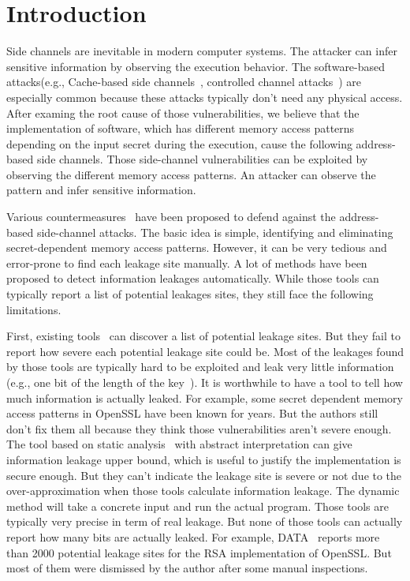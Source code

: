 \section{Introduction}

Side channels are inevitable in modern computer systems. The attacker can infer sensitive 
information by observing the execution behavior. The software-based attacks(e.g., Cache-based 
side channels~\cite{184415,191010,7163050,Osvik:2006:CAC:2117739.2117741}, 
controlled channel attacks~\cite{7163052}) 
are especially common because these attacks typically don't need any physical access. 
After examing the root cause of those vulnerabilities, we believe that the implementation 
of software, which has different memory access patterns depending on the input secret 
during the execution, cause the following address-based side channels. Those side-channel
vulnerabilities can be exploited by observing the different memory access patterns. An
attacker can observe the pattern and infer sensitive information.

Various countermeasures~\cite{182946,203878,217537} have been proposed to defend against the 
address-based side-channel attacks. The basic idea is simple, identifying 
and eliminating secret-dependent memory access patterns. 
However, it can be very tedious and error-prone to find each leakage site manually. 
A lot of methods have been proposed to detect information leakages automatically. 
While those tools can typically report a list of potential leakages sites, they still 
face the following limitations.

First, existing tools~\cite{203878, 217537} can discover a list of potential leakage sites. 
But they fail to report how severe each potential leakage site could be. Most of the leakages 
found by those tools are typically hard to be exploited and leak very little information 
(e.g., one bit of the length of the key~\cite{203878}).  
It is worthwhile to have a tool to tell how much information is actually leaked. 
For example, some secret dependent memory access patterns in OpenSSL have been known 
for years. But the authors still don't fix them all because they think 
those vulnerabilities aren’t severe enough. The tool based on static analysis~\cite{182946} with 
abstract interpretation can give information leakage upper bound, which is useful to 
justify the implementation is secure enough. But they can’t indicate the leakage site 
is severe or not due to the over-approximation when those tools calculate information leakage. 
The dynamic method will take a concrete input and run the actual program. 
Those tools are typically very precise in term of real leakage. But none of those tools 
can actually report how many bits are actually leaked. For example, DATA~\cite{217537} reports more 
than 2000 potential leakage sites for the RSA implementation of OpenSSL. But most of 
them were dismissed by the author after some manual inspections.

